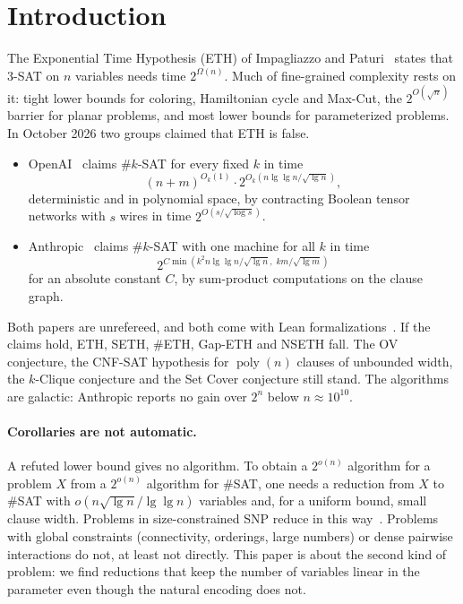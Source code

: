 \documentclass[11pt]{article}
\theoremstyle{remark}
\newcommand{\poly}{\operatorname{poly}}
\begin{document}
\section{Introduction}

The Exponential Time Hypothesis (ETH) of Impagliazzo and Paturi~\cite{IP01} states that 3-SAT on
$n$ variables needs time $2^{\Omega(n)}$. Much of fine-grained complexity rests on it: tight lower
bounds for coloring, Hamiltonian cycle and Max-Cut, the $2^{O(\sqrt n)}$ barrier for planar
problems, and most lower bounds for parameterized problems. In October 2026 two groups claimed that
ETH is false.

\begin{itemize}
\item OpenAI~\cite{openai} claims \#$k$-SAT for every fixed $k$ in time
\[(n+m)^{O_k(1)}\cdot 2^{O_k(n\lg\lg n/\sqrt{\lg n})},\]
deterministic and in polynomial space, by contracting Boolean tensor networks with $s$ wires in
time $2^{O(s/\sqrt{\log s})}$.
\item Anthropic~\cite{anthropic} claims \#$k$-SAT with one machine for all $k$ in time
\[2^{C\min(k^2 n\lg\lg n/\sqrt{\lg n},\; km/\sqrt{\lg m})}\]
for an absolute constant $C$, by sum-product computations on the clause graph.
\end{itemize}

Both papers are unrefereed, and both come with Lean formalizations~\cite{formalmath}. If the claims
hold, ETH, SETH, \#ETH, Gap-ETH and NSETH fall. The OV conjecture, the CNF-SAT hypothesis for
$\poly(n)$ clauses of unbounded width, the $k$-Clique conjecture and the Set Cover conjecture still
stand. The algorithms are galactic: Anthropic reports no gain over $2^n$ below $n\approx 10^{10}$.

\paragraph{Corollaries are not automatic.} A refuted lower bound gives no algorithm. To obtain a
$2^{o(n)}$ algorithm for a problem $X$ from a $2^{o(n)}$ algorithm for \#SAT, one needs a reduction
from $X$ to \#SAT with $o(n\sqrt{\lg n}/\lg\lg n)$ variables and, for a uniform bound, small clause
width. Problems in size-constrained SNP reduce in this way~\cite{IPZ01}. Problems with global
constraints (connectivity, orderings, large numbers) or dense pairwise interactions do not, at least
not directly. This paper is about the second kind of problem: we find reductions that keep the
number of variables linear in the parameter even though the natural encoding does not.
\end{document}
